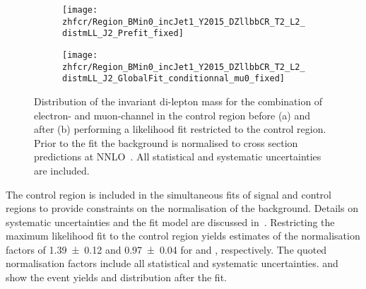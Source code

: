 
\begin{figure}[htbp]
  \centering

  \begin{subfigure}{.485\textwidth}
    \texttt{[image: zhfcr/Region\_BMin0\_incJet1\_Y2015\_DZllbbCR\_T2\_L2\_distmLL\_J2\_Prefit\_fixed]}
    \label{fig:zcr_mll_prefit}
  \end{subfigure}\hfill%
  \begin{subfigure}{.485\textwidth}
    \texttt{[image: zhfcr/Region\_BMin0\_incJet1\_Y2015\_DZllbbCR\_T2\_L2\_distmLL\_J2\_GlobalFit\_conditionnal\_mu0\_fixed]}
    \label{fig:zcr_mll_postfit}
  \end{subfigure}

  \caption{Distribution of the invariant di-lepton mass for the combination of
    electron- and muon-channel in the \ZHF control region before (a) and after
    (b) performing a likelihood fit restricted to the control region.
    Prior to the fit the \Zjets background is normalised to cross section
    predictions at NNLO~\cite{Anastasiou:2003ds}. All statistical and systematic
    uncertainties are included.}
\end{figure}

The \ZHF control region is included in the simultaneous fits of signal and
control regions to provide constraints on the normalisation of the \ZHF
background. Details on systematic uncertainties and the fit model are discussed
in~. Restricting the maximum
likelihood fit to the control region yields estimates of the normalisation
factors of \num{1.39 \pm 0.12} and \num{0.97 \pm 0.04} for \ZHF and \ttbar,
respectively. The quoted normalisation factors include all statistical and
systematic uncertainties.  and 
show the event yields and \mll distribution after the fit.

